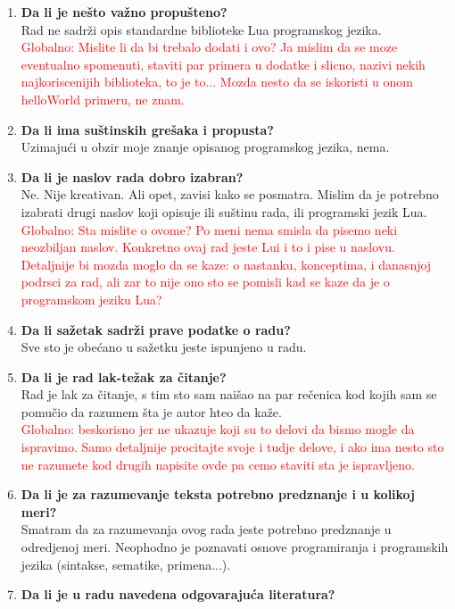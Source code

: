 \documentclass[a4paper]{report}
\newcommand{\note}[1]{\textcolor{red}{#1}}
\begin{document}
\begin{enumerate}
\item \textbf {Da li je nešto važno propušteno?}\\
  Rad ne sadr\v zi opis standardne biblioteke Lua programskog jezika. \\ \note{Globalno: Mislite li da bi trebalo dodati i ovo? Ja mislim da se moze eventualno spomenuti, staviti par primera u dodatke i slicno, nazivi nekih najkoriscenijih biblioteka, to je to... Mozda nesto da se iskoristi u onom helloWorld primeru, ne znam.}
\item \textbf {Da li ima suštinskih grešaka i propusta?}\\
  Uzimaju\' ci u obzir moje znanje opisanog programskog jezika, nema.
\item \textbf {Da li je naslov rada dobro izabran?}\\
  Ne. Nije kreativan. Ali opet, zavisi kako se posmatra. Mislim da je potrebno izabrati drugi naslov koji opisuje ili su\v stinu rada, ili programski jezik Lua. \\ \note{Globalno: Sta mislite o ovome? Po meni nema smisla da pisemo neki neozbiljan naslov. Konkretno ovaj rad jeste  Lui i to i pise u naslovu. Detaljnije bi mozda moglo da se kaze: o nastanku, konceptima, i danasnjoj podrsci za rad, ali zar to nije ono sto se pomisli kad se kaze da je o programskom jeziku Lua?}
\item \textbf {Da li sažetak sadrži prave podatke o radu?}\\
  Sve sto je obe\' cano u sa\v zetku jeste ispunjeno u radu.
\item \textbf {Da li je rad lak-težak za čitanje?}\\
  Rad je lak za \v citanje, s tim sto sam nai\v sao na par re\v cenica kod kojih sam se pomu\v cio da razumem \v sta je autor hteo da ka\v ze. \\ \note{Globalno: beskorisno jer ne ukazuje koji su to delovi da bismo mogle da ispravimo. Samo detaljnije procitajte svoje i tudje delove, i ako ima nesto sto ne razumete kod drugih napisite ovde pa cemo staviti sta je ispravljeno.}
\item \textbf {Da li je za razumevanje teksta potrebno predznanje i u kolikoj meri?}\\
  Smatram da za razumevanja ovog rada jeste potrebno predznanje u odredjenoj meri. Neophodno je poznavati osnove programiranja i programskih jezika (sintakse, sematike, primena...).
\item \textbf {Da li je u radu navedena odgovarajuća literatura?}\\

\end{enumerate}
\end{document}
